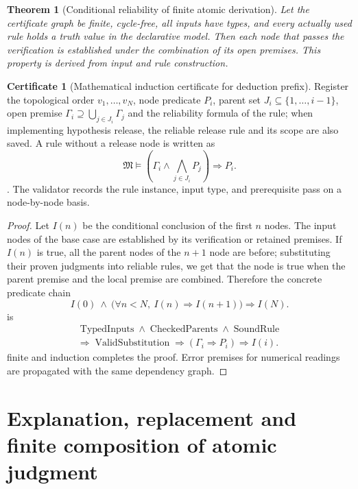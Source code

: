 \documentclass[12pt,a4paper,openany,notitlepage]{report}
\theoremstyle{plain}
\newtheorem{theorem}{Theorem}[chapter]
\theoremstyle{definition}
\newtheorem*{certificate}{Certificate}
\theoremstyle{remark}
\begin{document}
\begin{CJK*}
\begin{theorem}
[Conditional reliability of finite atomic derivation]\label{hgov:thm:atomsound}
Let the certificate graph be finite, cycle-free, all inputs have types, and every actually used rule holds a truth value in the declarative model. Then each node that passes the verification is established under the combination of its open premises. This property is derived from input and rule construction.\end{theorem}
\begin{certificate}
[Mathematical induction certificate for deduction prefix]Register the topological order $v_1,\ldots,v_N$, node predicate $P_i$, parent set $J_i\subseteq\{1,\ldots,i-1\}$, open premise $\Gamma_i\supseteq\bigcup_{j\in J_i}\Gamma_j$ and the reliability formula of the rule; when implementing hypothesis release, the reliable release rule and its scope are also saved. A rule without a release node is written as \[
\mathfrak M\models
\left(\Gamma_i\land\bigwedge_{j\in J_i}P_j\right)\Rightarrow P_i.
\]. The validator records the rule instance, input type, and prerequisite pass on a node-by-node basis.\end{certificate}
\begin{proof}
Let $I(n)$ be the conditional conclusion of the first $n$ nodes. The input nodes of the base case are established by its verification or retained premises. If $I(n)$ is true, all the parent nodes of the $n+1$ node are before; substituting their proven judgments into reliable rules, we get that the node is true when the parent premise and the local premise are combined. Therefore the concrete predicate chain \[
I(0)\ \land\
\bigl(\forall n<N,\ I(n)\Rightarrow I(n+1)\bigr)
\Rightarrow I(N).
\] is \[
\begin{gathered}
\operatorname{TypedInputs}\land\operatorname{CheckedParents}
\land\operatorname{SoundRule}\\
\Rightarrow\operatorname{ValidSubstitution}
\Rightarrow(\Gamma_i\Rightarrow P_i)
\Rightarrow I(i).
\end{gathered}
\] finite and induction completes the proof. Error premises for numerical readings are propagated with the same dependency graph.\end{proof}


\section { Explanation, replacement and finite composition of atomic judgment }


\end{CJK*}
\end{document}
